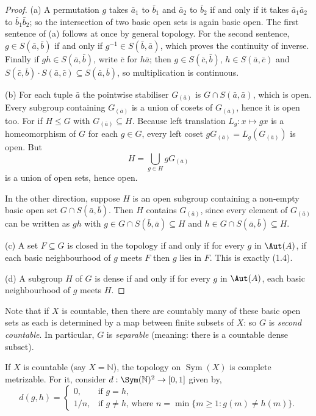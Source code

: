 \begin{proof}
    (a) A permutation $g$ takes $\bar{a}_1$ to $\bar{b}_1$ and $\bar{a}_2$ to $\bar{b}_2$ if and only if it takes $\bar{a}_1 \bar{a}_2$ to $\bar{b}_1 \bar{b}_2$; so the intersection of two basic open sets is again basic open. The first sentence of (a) follows at once by general topology. For the second sentence, $g \in S(\bar{a}, \bar{b})$ if and only if $g^{-1} \in S(\bar{b}, \bar{a})$, which proves the continuity of inverse. Finally if $gh \in S(\bar{a}, \bar{b})$, write $\bar{c}$ for $h\bar{a}$; then $g \in S(\bar{c}, \bar{b})$, $h \in S(\bar{a}, \bar{c})$ and $S(\bar{c}, \bar{b}) \cdot S(\bar{a}, \bar{c}) \subseteq S(\bar{a}, \bar{b})$, so multiplication is continuous.

    (b) For each tuple $\bar{a}$ the pointwise stabiliser $G_{(\bar{a})}$ is $G \cap S(\bar{a}, \bar{a})$, which is open. Every subgroup containing $G_{(\bar{a})}$ is a union of cosets of $G_{(\bar{a})}$, hence it is open too.
    For if  $H\leq G$ with $G_{(\bar a)}\subseteq H$.
    Because left translation $L_g:x\mapsto gx$ is a homeomorphism of $G$ for each $g\in G$, every left coset $gG_{(\bar a)}=L_g(G_{(\bar a)})$ is open. But
    \[
        H=\bigcup_{g\in H} gG_{(\bar a)}
    \]
    is a union of open sets, hence open.

    In the other direction, suppose $H$ is an open subgroup containing a non-empty basic open set $G \cap S(\bar{a}, \bar{b})$. Then $H$ contains $G_{(\bar{a})}$, since every element of $G_{(\bar{a})}$ can be written as $gh$ with $g \in G \cap S(\bar{b}, \bar{a}) \subseteq H$ and $h \in G \cap S(\bar{a}, \bar{b}) \subseteq H$.

    (c) A set $F \subseteq G$ is closed in the topology if and only if for every $g$ in $\Aut(A)$, if each basic neighbourhood of $g$ meets $F$ then $g$ lies in $F$. This is exactly (1.4).

    (d) A subgroup $H$ of $G$ is dense if and only if for every $g$ in $\Aut(A)$, each basic neighbourhood of $g$ meets $H$.
\end{proof}


Note that if $X$ is countable, then there are countably many of these basic open sets as each is determined by a map between finite subsets of $X$: so $G$ is \emph{second countable}. In particular, $G$ is \emph{separable} (meaning: there is a countable dense subset).

If $X$ is countable (say $X = \mathbb{N}$), the topology on $\operatorname{Sym}(X)$ is complete metrizable. For it, consider $d:\Sym(\mathbb{N})^2\to[0,1]$  given by,
\[
    d(g,h)=
    \begin{cases}
        0,   & \text{if }g=h,                                                  \\[2pt]
        1/n, & \text{if }g\neq h\text{, where }n=\min\{m\ge1: g(m)\neq h(m)\}.
    \end{cases}
\]

